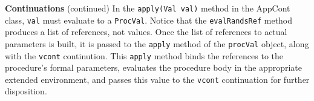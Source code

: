 \begin{minipage}[t]{\sw}
\slidenumber
\LARGE
{\bf Continuations} (continued)\exx
In the \verb'apply(Val val)' method in the AppCont class,
\verb'val' must evaluate to a \verb'ProcVal'.
Notice that the \verb'evalRandsRef' method
produces a list of references, not values.
Once the list of references to actual parameters is built,
it is passed to the \verb'apply' method
of the \verb'procVal' object,
along with the \verb'vcont' continution.
This \verb'apply' method binds the references
to the procedure's formal parameters,
evaluates the procedure body
in the appropriate extended environment,
and passes this value to the \verb'vcont' continuation
for further disposition.\exx
\end{minipage}
